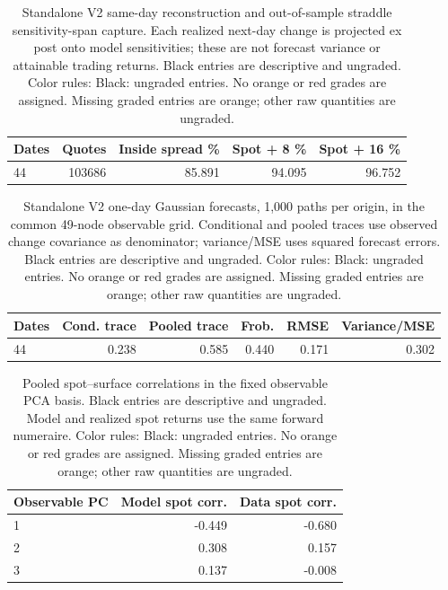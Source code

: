 \documentclass[11pt]{article}
\begin{document}
\begin{table}[H]\centering\small\setlength{\tabcolsep}{4pt}
\caption{Standalone V2 same-day reconstruction and out-of-sample straddle sensitivity-span capture. Each realized next-day change is projected ex post onto model sensitivities; these are not forecast variance or attainable trading returns. Black entries are descriptive and ungraded. Color rules: Black: ungraded entries. No orange or red grades are assigned. Missing graded entries are orange; other raw quantities are ungraded.}\label{tab:standalone-v2-span}
\begin{tabular}{@{}lrrrr@{}}
\toprule
Dates & Quotes & Inside spread \% & Spot + 8 \% & Spot + 16 \% \\
\midrule
44 & 103686 & 85.891 & 94.095 & 96.752 \\
\bottomrule\end{tabular}\end{table}

\begin{table}[H]\centering\small\setlength{\tabcolsep}{4pt}
\caption{Standalone V2 one-day Gaussian forecasts, 1,000 paths per origin, in the common 49-node observable grid. Conditional and pooled traces use observed change covariance as denominator; variance/MSE uses squared forecast errors. Black entries are descriptive and ungraded. Color rules: Black: ungraded entries. No orange or red grades are assigned. Missing graded entries are orange; other raw quantities are ungraded.}\label{tab:standalone-v2-forecast}
\begin{tabular}{@{}lrrrrr@{}}
\toprule
Dates & Cond. trace & Pooled trace & Frob. & RMSE & Variance/MSE \\
\midrule
44 & 0.238 & 0.585 & 0.440 & 0.171 & 0.302 \\
\bottomrule\end{tabular}\end{table}

\begin{table}[H]\centering\small\setlength{\tabcolsep}{4pt}
\caption{Pooled spot--surface correlations in the fixed observable PCA basis. Black entries are descriptive and ungraded. Model and realized spot returns use the same forward numeraire. Color rules: Black: ungraded entries. No orange or red grades are assigned. Missing graded entries are orange; other raw quantities are ungraded.}\label{tab:standalone-v2-leverage}
\begin{tabular}{@{}lrr@{}}
\toprule
Observable PC & Model spot corr. & Data spot corr. \\
\midrule
1 & -0.449 & -0.680 \\
2 & 0.308 & 0.157 \\
3 & 0.137 & -0.008 \\
\bottomrule\end{tabular}\end{table}
\end{document}
